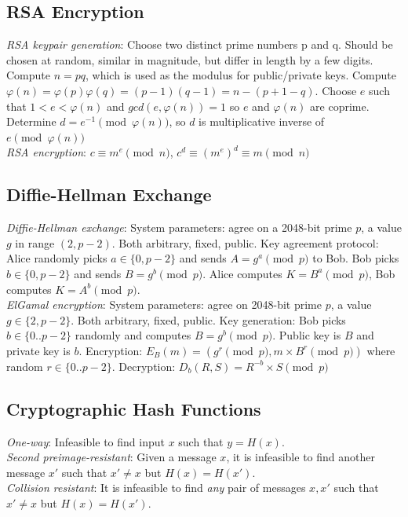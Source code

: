 \documentclass[10pt,landscape]{article}
\newcommand{\totient}{\varphi}
\begin{document}
\begin{multicols}{3}
\subsection{RSA Encryption}

\textit{RSA keypair generation}: Choose two distinct prime numbers p and q. Should be chosen at random, similar in magnitude, but differ in length by a few digits. Compute $n = pq$, which is used as the modulus for public/private keys. Compute $\totient(n) = \totient(p)\totient(q) = (p-1)(q-1) = n -(p+1-q)$. Choose $e$ such that $1 < e < \totient(n)$ and $gcd(e, \totient(n)) = 1$ so $e$ and $\totient(n)$ are coprime. Determine $d = e^{-1} \pmod{\totient(n)}$, so $d$ is multiplicative inverse of $e \pmod{\totient(n)}$ \\
\textit{RSA encryption}: $c \equiv m^e \pmod{n}$, $c^d \equiv (m^e)^d \equiv m \pmod{n}$

\subsection{Diffie-Hellman Exchange}

\textit{Diffie-Hellman exchange}: System parameters: agree on a 2048-bit prime $p$, a value $g$ in range $(2, p-2)$. Both arbitrary, fixed, public. Key agreement protocol: Alice randomly picks $a \in \{0, p-2\}$ and sends $A = g^a \pmod{p}$ to Bob. Bob picks $b \in \{0, p-2\}$ and sends $B = g^b \pmod{p}$. Alice computes $K = B^a \pmod{p}$, Bob computes $K = A^b \pmod{p}$. \\
\textit{ElGamal encryption}: System parameters: agree on 2048-bit prime $p$, a value $g \in \{2, p-2\}$. Both arbitrary, fixed, public. Key generation: Bob picks $b \in \{0..p-2\}$ randomly and computes $B = g^b \pmod{p}$. Public key is $B$ and private key is $b$. Encryption: $E_B(m) = (g^r \pmod{p}, m \times B^r \pmod{p})$ where random $r \in \{0..p-2\}$. Decryption: $D_b(R, S) = R^{-b} \times S \pmod{p}$


\subsection{Cryptographic Hash Functions}

\textit{One-way}: Infeasible to find input $x$ such that $y = H(x)$. \\
\textit{Second preimage-resistant}: Given a message $x$, it is infeasible to find another message $x'$ such that $x' \ne x$ but $H(x) = H(x')$. \\
\textit{Collision resistant}: It is infeasible to find \textit{any} pair of messages $x, x'$ such that $x' \ne x$ but $H(x) = H(x')$. \\



\end{multicols}
\end{document}
